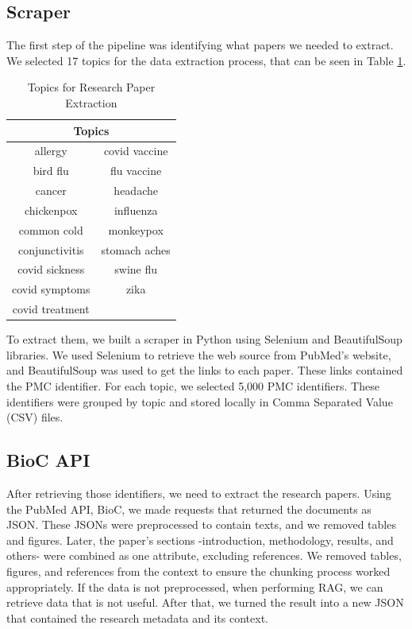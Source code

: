 \subsection{Scraper}
The first step of the pipeline was identifying what papers we needed to extract. We selected 17 topics for the data extraction process, that can be seen in Table \ref{table:topics}.

\begin{table}[!ht]
	\centering
	\caption{Topics for Research Paper Extraction}
	\begin{tabular}{||c | c||} 
			\hline
			 \multicolumn{2}{||c||}{\textbf{Topics}} \\ [1.5ex] 
			\hline
			allergy  & covid vaccine \\ [1ex]
			\hline
			bird flu & flu vaccine \\ [1ex]
			\hline
			cancer & headache \\ [1ex]
			\hline
			chickenpox & influenza\\ [1ex]
			\hline
			common cold & monkeypox \\ [1ex]
			\hline
			conjunctivitis & stomach aches \\ [1ex]
			\hline
			covid sickness & swine flu \\ [1ex]
			\hline
			covid symptoms & zika\\ [1ex]
			\hline
			covid treatment &  \\ [1ex]
			\hline
			\end{tabular}
	\label{table:topics}
\end{table}


To extract them, we built a scraper in Python using Selenium and BeautifulSoup libraries. We used Selenium to retrieve the web source from PubMed's website, and BeautifulSoup was used to get the links to each paper. These links contained the PMC identifier. For each topic, we selected 5,000 PMC identifiers. These identifiers were grouped by topic and stored locally in Comma Separated Value (CSV) files.

\subsection{BioC API}
After retrieving those identifiers, we need to extract the research papers. Using the PubMed API, BioC, we made requests that returned the documents as JSON. These JSONs were preprocessed to contain texts, and we removed tables and figures. Later, the paper's sections -introduction, methodology, results, and others- were combined as one attribute, excluding references. We removed tables, figures, and references from the context to ensure the chunking process worked appropriately. If the data is not preprocessed, when performing RAG, we can retrieve data that is not useful. After that, we turned the result into a new JSON that contained the research metadata and its context. 

